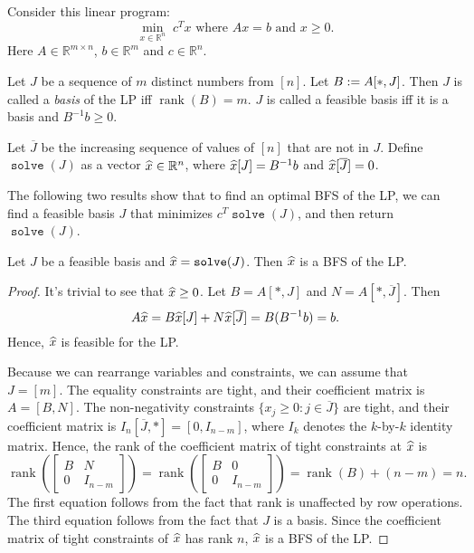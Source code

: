 \documentclass[a4paper, 12pt, fleqn]{article}
\newcommand*{\Jcomp}{\overline{J}}
\DeclareMathOperator{\rank}{rank}
\DeclareMathOperator{\solve}{\mathtt{solve}}
\newenvironment*{longProof}{\begin{proof}}{\end{proof}}
\begin{document}
Consider this linear program:
\[ \min_{x \in \mathbb{R}^n}\; c^Tx \textrm{ where } Ax = b \textrm{ and } x \ge 0. \]
Here $A \in \mathbb{R}^{m \times n}$, $b \in \mathbb{R}^m$ and $c \in \mathbb{R}^n$.

\begin{definition}[Basis]
Let $J$ be a sequence of $m$ distinct numbers from $[n]$.
Let $B := A[*,J]$.
Then $J$ is called a \emph{basis} of the LP iff $\rank(B) = m$.
$J$ is called a feasible basis iff it is a basis and $B^{-1}b \ge 0$.

Let $\Jcomp$ be the increasing sequence of values of $[n]$ that are not in $J$.
Define $\solve(J)$ as a vector $\widehat{x} \in \mathbb{R}^n$,
where $\widehat{x}[J] = B^{-1}b$ and $\xhat[\Jcomp] = 0$.
\end{definition}

The following two results show that to find an optimal BFS of the LP,
we can find a feasible basis $J$ that minimizes $c^T\solve(J)$, and then return $\solve(J)$.

\begin{lemma}
\label{thm:basis-gives-bfs}
Let $J$ be a feasible basis and $\xhat = \solve(J)$.
Then $\widehat{x}$ is a BFS of the LP.
\end{lemma}
\begin{longProof}
It's trivial to see that $\widehat{x} \ge 0$. Let $B = A[*,J]$ and $N = A[*,\Jcomp]$. Then
\[ A\xhat = B\xhat[J] + N\xhat[\Jcomp] = B(B^{-1}b) = b. \]
Hence, $\widehat{x}$ is feasible for the LP.

Because we can rearrange variables and constraints, we can assume \wLoG{} that $J = [m]$.
The equality constraints are tight, and their coefficient matrix is $A = [B, N]$.
The non-negativity constraints $\{x_j \ge 0: j \in \Jcomp\}$ are tight,
and their coefficient matrix is $I_n[\Jcomp,*] = [0, I_{n-m}]$,
where $I_k$ denotes the $k$-by-$k$ identity matrix.
Hence, the rank of the coefficient matrix of tight constraints at $\widehat{x}$ is
\[ \rank\left(\begin{bmatrix}B & N \\ 0 & I_{n-m}\end{bmatrix}\right)
= \rank\left(\begin{bmatrix}B & 0 \\ 0 & I_{n-m}\end{bmatrix}\right)
= \rank(B) + (n-m) = n. \]
The first equation follows from the fact that rank is unaffected by row operations.
The third equation follows from the fact that $J$ is a basis.
Since the coefficient matrix of tight constraints of $\widehat{x}$ has rank $n$,
$\widehat{x}$ is a BFS of the LP.
\end{longProof}
\end{document}
